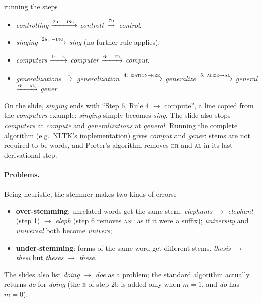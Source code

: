 \begin{nbexample}{running the steps}
\begin{itemize}[nosep]
  \item \emph{controlling} $\xrightarrow{\text{2a: } -\textsc{ing}}$ \emph{controll}
        $\xrightarrow{\text{7b}}$ \emph{control}.
  \item \emph{singing} $\xrightarrow{\text{2a: } -\textsc{ing}}$ \emph{sing} (no further
        rule applies).
  \item \emph{computers} $\xrightarrow{\text{1: } -\textsc{s}}$ \emph{computer}
        $\xrightarrow{\text{6: } -\textsc{er}}$ \emph{comput}.
  \item \emph{generalizations} $\xrightarrow{\text{1}}$ \emph{generalization}
        $\xrightarrow{\text{4: \textsc{ization}}\to\textsc{ize}}$ \emph{generalize}
        $\xrightarrow{\text{5: \textsc{alize}}\to\textsc{al}}$ \emph{general}
        $\xrightarrow{\text{6: } -\textsc{al}}$ \emph{gener}.
\end{itemize}
\end{nbexample}

\begin{nbwarning}
On the slide, \emph{singing} ends with ``Step 6, Rule 4 $\to$ compute'', a line copied
from the \emph{computers} example: \emph{singing} simply becomes \emph{sing}. The slide
also stops \emph{computers} at \emph{compute} and \emph{generalizations} at
\emph{general}. Running the complete algorithm (e.g.\ NLTK's implementation) gives
\emph{comput} and \emph{gener}: stems are not required to be words, and Porter's
algorithm removes \textsc{er} and \textsc{al} in its last derivational step.
\end{nbwarning}

\paragraph{Problems.} Being heuristic, the stemmer makes two kinds of errors:
\begin{itemize}[nosep]
  \item \textbf{over-stemming}: unrelated words get the same stem. \emph{elephants}
        $\to$ \emph{elephant} (step 1) $\to$ \emph{eleph} (step 6 removes \textsc{ant} as
        if it were a suffix); \emph{university} and \emph{universal} both become
        \emph{univers};
  \item \textbf{under-stemming}: forms of the same word get different stems.
        \emph{thesis} $\to$ \emph{thesi} but \emph{theses} $\to$ \emph{these}.
\end{itemize}
The slides also list \emph{doing} $\to$ \emph{doe} as a problem; the standard algorithm
actually returns \emph{do} for \emph{doing} (the \textsc{e} of step 2b is added only when
$m=1$, and \emph{do} has $m=0$).

